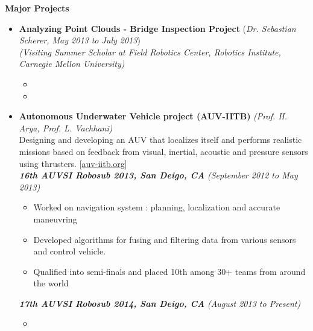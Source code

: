 \documentclass[a4paper,11pt]{article}
\newcommand{\resheading}[1]{{\small \colorbox{mygrey}{\begin{minipage}{0.975\textwidth}{\textbf{#1 \vphantom{p\^{E}}}}\end{minipage}}}}
\begin{document}
\resheading{\textbf{\large{Major Projects}}}
\begin{itemize}

    \item \textbf{Analyzing Point Clouds - Bridge Inspection Project} \hfill (\emph{Dr. Sebastian Scherer, May 2013 to July 2013}) \\
        \emph{(Visiting Summer Scholar at Field Robotics Center, Robotics Institute, Carnegie Mellon University)}
        \begin{itemize}
            \item 
            \item
        \end{itemize}

    \item \textbf{Autonomous Underwater Vehicle project (AUV-IITB)} \hfill \emph{(Prof. H. Arya, Prof. L. Vachhani)} \\
        Designing and developing an AUV that localizes itself and performs realistic missions based on feedback from visual, inertial, acoustic and pressure sensors using thrusters. \hfill  [\href{http://auv-iitb.org}{auv-iitb.org}] \\[0.1cm]
        \textbf{\emph{16th AUVSI Robosub 2013, San Deigo, CA}} \hfill \emph{(September 2012 to May 2013) } \\[-0.6cm]
        \begin{itemize}
            \item Worked on navigation system : planning, localization and accurate maneuvring
            \item Developed algorithms for fusing and filtering data from various sensors and control vehicle. 
            \item Qualified into semi-finals and placed 10th among 30+ teams from around the world
        \end{itemize}
        \textbf{\emph{17th AUVSI Robosub 2014, San Deigo, CA}} \hfill \emph{(August 2013 to Present) } \\[-0.6cm]
        \begin{itemize}
            \item 
        \end{itemize}


\end{itemize}
\end{document}
